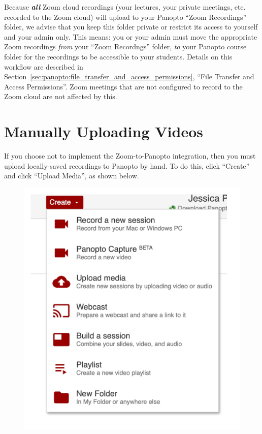 \begin{important}
	Because \emph{\textbf{all}} Zoom cloud recordings (your lectures, your private meetings, etc. recorded to the Zoom cloud) will upload to your Panopto ``Zoom Recordings'' folder, we advise that you keep this folder private or restrict its access to yourself and your admin only. This means: you or your admin must move the appropriate Zoom recordings \emph{from} your ``Zoom Recordngs'' folder, \emph{to} your Panopto course folder for the recordings to be accessible to your students. Details on this workflow are described in Section~\ref{sec:panopto:file_transfer_and_access_permissions}, ``File Transfer and Access Permissions''. Zoom meetings that are not configured to record to the Zoom cloud are not affected by this.
\end{important}


\section{Manually Uploading Videos}
\label{sec:panopto:manually_uploading_videos}

If you choose not to implement the Zoom-to-Panopto integration, then you must upload locally-saved recordings to Panopto by hand. To do this, click ``Create'' and click ``Upload Media'', as shown below.

\begin{figure}[H]
	\centering
	\includegraphics[scale=0.6]{panopto/07-create.png}
\end{figure}


